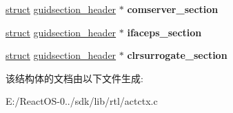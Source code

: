 \begin{DoxyCompactItemize}
\item 
\mbox{\label{struct___a_c_t_i_v_a_t_i_o_n___c_o_n_t_e_x_t_a8ee117b87045d7028b54898f6985817a}} 
\hyperlink{interfacestruct}{struct} \hyperlink{structguidsection__header}{guidsection\+\_\+header} $\ast$ {\bfseries comserver\+\_\+section}
\item 
\mbox{\label{struct___a_c_t_i_v_a_t_i_o_n___c_o_n_t_e_x_t_a54add03c0e4932fcadac43eded91f463}} 
\hyperlink{interfacestruct}{struct} \hyperlink{structguidsection__header}{guidsection\+\_\+header} $\ast$ {\bfseries ifaceps\+\_\+section}
\item 
\mbox{\label{struct___a_c_t_i_v_a_t_i_o_n___c_o_n_t_e_x_t_ae602687a71a2ed6009100eadf026db8c}} 
\hyperlink{interfacestruct}{struct} \hyperlink{structguidsection__header}{guidsection\+\_\+header} $\ast$ {\bfseries clrsurrogate\+\_\+section}
\end{DoxyCompactItemize}


该结构体的文档由以下文件生成\+:\begin{DoxyCompactItemize}
\item 
E\+:/\+React\+O\+S-\/0../sdk/lib/rtl/actctx.\+c\end{DoxyCompactItemize}
